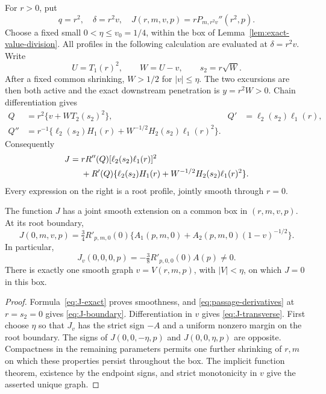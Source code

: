 For \(r>0\), put
\begin{equation}\label{eq:J-definition}
 q=r^2,\quad \delta=r^2v,\quad
 J(r,m,v,p)=rP_{m,r^2v}''(r^2,p).
\end{equation}
Choose a fixed small \(0<\eta\le v_0=1/4\), within the box of Lemma~\ref{lem:exact-value-division}. All profiles in the following
calculation are evaluated at \(\delta=r^2v\).
Write
\[
 U=T_1(r)^2,\qquad W=U-v,\qquad s_2=r\sqrt{W}.
\]
After a fixed common shrinking, \(W>1/2\) for \(|v|\le\eta\).
The two excursions are then both active and the exact downstream
penetration is \(y=r^2W>0\). Chain differentiation gives
\begin{align}
 Q&=r^2\{v+WT_2(s_2)^2\},&
 Q'&=\ell_2(s_2)\ell_1(r),\label{eq:Q-outer}\\
 Q''&=r^{-1}\{\ell_2(s_2)H_1(r)
       +W^{-1/2}H_2(s_2)\ell_1(r)^2\}.\label{eq:Q-curvature}
\end{align}
Consequently
\begin{align}\label{eq:J-exact}
 J={}&rR''(Q)[\ell_2(s_2)\ell_1(r)]^2\\
 &+R'(Q)\{\ell_2(s_2)H_1(r)
               +W^{-1/2}H_2(s_2)\ell_1(r)^2\}.\notag
\end{align}
Every expression on the right is a root profile, jointly smooth through
\(r=0\).

\begin{lemma}\label{lem:curvature-profile}
The function \(J\) has a joint smooth extension on a common box
in \((r,m,v,p)\). At its root boundary,
\begin{equation}\label{eq:J-boundary}
 J(0,m,v,p)
 =\tfrac34 R'_{p,m,0}(0)
     \{A_1(p,m,0)+A_2(p,m,0)(1-v)^{-1/2}\}.
\end{equation}
In particular,
\begin{equation}\label{eq:J-transverse}
 J_v(0,0,0,p)=-\tfrac38 R'_{p,0,0}(0)A(p)\ne0.
\end{equation}
There is exactly one smooth graph \(v=V(r,m,p)\), with
\(|V|<\eta\), on which \(J=0\) in this box.
\end{lemma}

\begin{proof}
Formula~\eqref{eq:J-exact} proves smoothness, and
\eqref{eq:passage-derivatives} at \(r=s_2=0\) gives
\eqref{eq:J-boundary}. Differentiation in \(v\) gives
\eqref{eq:J-transverse}. First choose \(\eta\) so that \(J_v\) has
the strict sign \(-A\) and a uniform nonzero margin on the root
boundary. The signs of \(J(0,0,-\eta,p)\) and
\(J(0,0,\eta,p)\) are opposite. Compactness in the remaining
parameters permits one further shrinking of \(r,m\) on which these
properties persist throughout the box. The implicit function theorem,
existence by the endpoint signs, and strict monotonicity in \(v\)
give the asserted unique graph.
\end{proof}

